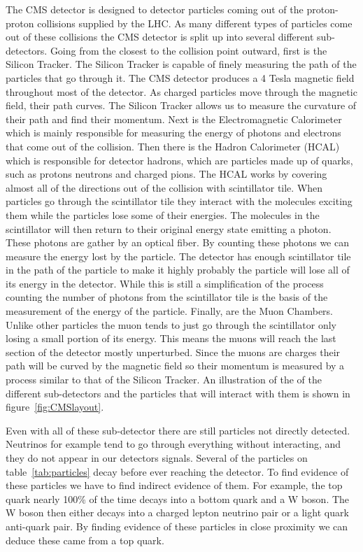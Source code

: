 The CMS detector is designed to detector particles coming out of the proton-proton collisions supplied by the LHC. As many different types of particles come out of these collisions the CMS detector is split up into several different sub-detectors. Going from the closest to the collision point outward, first is the Silicon Tracker. The Silicon Tracker is capable of finely measuring the path of the particles that go through it. The CMS detector produces a 4 Tesla magnetic field throughout most of the detector. As charged particles move through the magnetic field, their path curves. The Silicon Tracker allows us to measure the curvature of their path and find their momentum. Next is the Electromagnetic Calorimeter which is mainly responsible for measuring the energy of photons and electrons that come out of the collision. Then there is the Hadron Calorimeter (HCAL) which is responsible for detector hadrons, which are particles made up of quarks, such as protons neutrons and charged pions. The HCAL works by covering almost all of the directions out of the collision with scintillator tile. When particles go through the scintillator tile they interact with the molecules exciting them while the particles lose some of their energies. The molecules in the scintillator will then return to their original energy state emitting a photon. These photons are gather by an optical fiber. By counting these photons we can measure the energy lost by the particle. The detector has enough scintillator tile in the path of the particle to make it highly probably the particle will lose all of its energy in the detector. While this is still a simplification of the process counting the number of photons from the scintillator tile is the basis of the measurement of the energy of the particle. Finally, are the Muon Chambers. Unlike other particles the muon tends to just go through the scintillator only losing a small portion of its energy. This means the muons will reach the last section of the detector mostly unperturbed. Since the muons are charges their path will be curved by the magnetic field so their momentum is measured by a process similar to that of the Silicon Tracker. An illustration of the of the different sub-detectors and the particles that will interact with them is shown in figure~\ref{fig:CMSlayout}.

Even with all of these sub-detector there are still particles not directly detected. Neutrinos for example tend to go through everything without interacting, and they do not appear in our detectors signals. Several of the particles on table~\ref{tab:particles} decay before ever reaching the detector. To find evidence of these particles we have to find indirect evidence of them. For example, the top quark nearly 100\% of the time decays into a bottom quark and a W boson. The W boson then either decays into a charged lepton neutrino pair or a light quark anti-quark pair. By finding evidence of these particles in close proximity we can deduce these came from a top quark.

